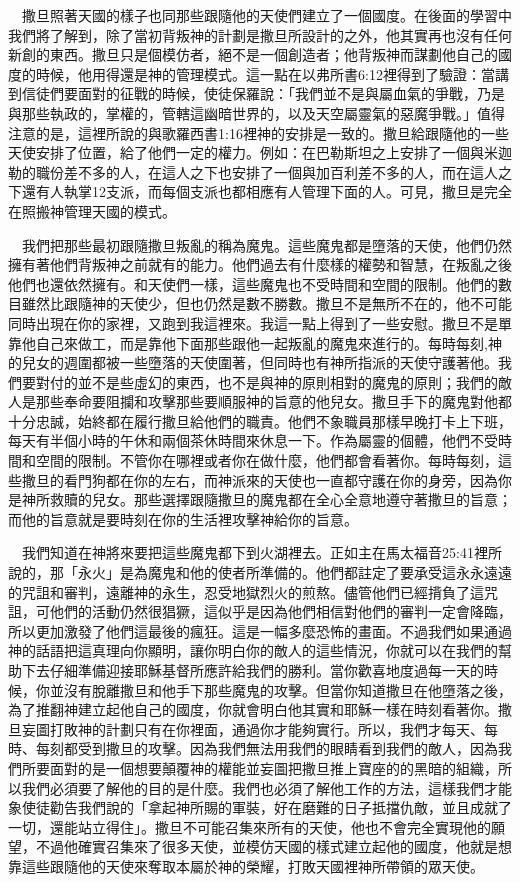 \documentclass{book}
\begin{document}
　撒旦照著天國的樣子也同那些跟隨他的天使們建立了一個國度。在後面的學習中我們將了解到，除了當初背叛神的計劃是撒旦所設計的之外，他其實再也沒有任何新創的東西。撒旦只是個模仿者，絕不是一個創造者；他背叛神而謀劃他自己的國度的時候，他用得還是神的管理模式。這一點在以弗所書6:12裡得到了驗證：當講到信徒們要面對的征戰的時候，使徒保羅說：「我們並不是與屬血氣的爭戰，乃是與那些執政的，掌權的，管轄這幽暗世界的，以及天空屬靈氣的惡魔爭戰。」值得注意的是，這裡所說的與歌羅西書1:16裡神的安排是一致的。撒旦給跟隨他的一些天使安排了位置，給了他們一定的權力。例如：在巴勒斯坦之上安排了一個與米迦勒的職份差不多的人，在這人之下也安排了一個與加百利差不多的人，而在這人之下還有人執掌12支派，而每個支派也都相應有人管理下面的人。可見，撒旦是完全在照搬神管理天國的模式。

　我們把那些最初跟隨撒旦叛亂的稱為魔鬼。這些魔鬼都是墮落的天使，他們仍然擁有著他們背叛神之前就有的能力。他們過去有什麼樣的權勢和智慧，在叛亂之後他們也還依然擁有。和天使們一樣，這些魔鬼也不受時間和空間的限制。他們的數目雖然比跟隨神的天使少，但也仍然是數不勝數。撒旦不是無所不在的，他不可能同時出現在你的家裡，又跑到我這裡來。我這一點上得到了一些安慰。撒旦不是單靠他自己來做工，而是靠他下面那些跟他一起叛亂的魔鬼來進行的。每時每刻,神的兒女的週圍都被一些墮落的天使圍著，但同時也有神所指派的天使守護著他。我們要對付的並不是些虛幻的東西，也不是與神的原則相對的魔鬼的原則；我們的敵人是那些奉命要阻攔和攻擊那些要順服神的旨意的他兒女。撒旦手下的魔鬼對他都十分忠誠，始終都在履行撒旦給他們的職責。他們不象職員那樣早晚打卡上下班，每天有半個小時的午休和兩個茶休時間來休息一下。作為屬靈的個體，他們不受時間和空間的限制。不管你在哪裡或者你在做什麼，他們都會看著你。每時每刻，這些撒旦的看門狗都在你的左右，而神派來的天使也一直都守護在你的身旁，因為你是神所救贖的兒女。那些選擇跟隨撒旦的魔鬼都在全心全意地遵守著撒旦的旨意；而他的旨意就是要時刻在你的生活裡攻擊神給你的旨意。

　我們知道在神將來要把這些魔鬼都下到火湖裡去。正如主在馬太福音25:41裡所說的，那「永火」是為魔鬼和他的使者所準備的。他們都註定了要承受這永永遠遠的咒詛和審判，遠離神的永生，忍受地獄烈火的煎熬。儘管他們已經揹負了這咒詛，可他們的活動仍然很猖獗，這似乎是因為他們相信對他們的審判一定會降臨，所以更加激發了他們這最後的瘋狂。這是一幅多麼恐怖的畫面。不過我們如果通過神的話語把這真理向你顯明，讓你明白你的敵人的這些情況，你就可以在我們的幫助下去仔細準備迎接耶穌基督所應許給我們的勝利。當你歡喜地度過每一天的時候，你並沒有脫離撒旦和他手下那些魔鬼的攻擊。但當你知道撒旦在他墮落之後，為了推翻神建立起他自己的國度，你就會明白他其實和耶穌一樣在時刻看著你。撒旦妄圖打敗神的計劃只有在你裡面，通過你才能夠實行。所以，我們才每天、每時、每刻都受到撒旦的攻擊。因為我們無法用我們的眼睛看到我們的敵人，因為我們所要面對的是一個想要顛覆神的權能並妄圖把撒旦推上寶座的的黑暗的組織，所以我們必須要了解他的目的是什麼。我們也必須了解他工作的方法，這樣我們才能象使徒勸告我們說的「拿起神所賜的軍裝，好在磨難的日子抵擋仇敵，並且成就了一切，還能站立得住」。撒旦不可能召集來所有的天使，他也不會完全實現他的願望，不過他確實召集來了很多天使，並模仿天國的樣式建立起他的國度，他就是想靠這些跟隨他的天使來奪取本屬於神的榮耀，打敗天國裡神所帶領的眾天使。
\end{document}
